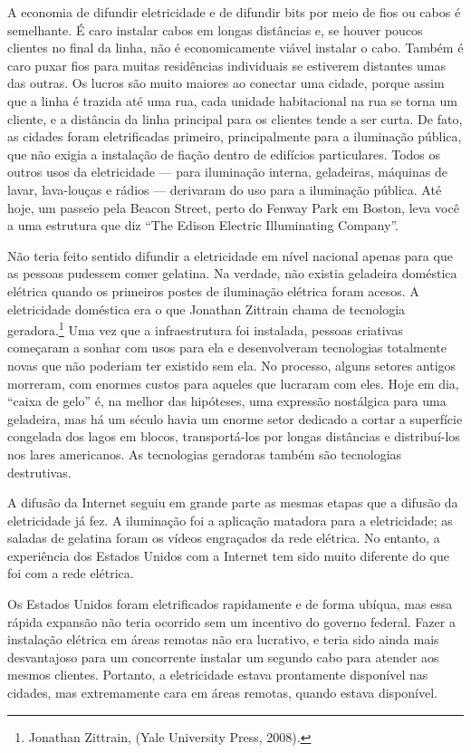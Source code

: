 A economia de difundir eletricidade e de difundir bits por meio de fios ou cabos é semelhante.
É caro instalar cabos em longas distâncias e, se houver poucos clientes no final da linha, não
é economicamente viável instalar o cabo. Também é caro puxar fios para muitas residências
individuais se estiverem distantes umas das outras. Os lucros são muito maiores ao conectar uma
cidade, porque assim que a linha é trazida até uma rua, cada unidade habitacional na rua se
torna um cliente, e a distância da linha principal para os clientes tende a ser curta. De fato,
as cidades foram eletrificadas primeiro, principalmente para a iluminação pública, que não exigia
a instalação de fiação dentro de edifícios particulares. Todos os outros usos da eletricidade
--- para iluminação interna, geladeiras, máquinas de lavar, lava-louças e rádios --- derivaram do
uso para a iluminação pública. Até hoje, um passeio pela Beacon Street, perto do Fenway Park em
Boston, leva você a uma estrutura que diz ``The Edison Electric Illuminating Company''.

Não teria feito sentido difundir a eletricidade em nível nacional apenas para que as pessoas
pudessem comer gelatina. Na verdade, não existia geladeira doméstica elétrica quando os primeiros
postes de iluminação elétrica foram acesos. A eletricidade doméstica era o que Jonathan Zittrain
chama de tecnologia geradora.\footnote{Jonathan Zittrain,  (Yale University Press, 2008).} Uma vez que a infraestrutura foi instalada,
pessoas criativas começaram a sonhar com usos para ela e desenvolveram tecnologias totalmente
novas que não poderiam ter existido sem ela. No processo, alguns setores antigos morreram, com
enormes custos para aqueles que lucraram com eles. Hoje em dia, ``caixa de gelo'' é, na melhor das
hipóteses, uma expressão nostálgica para uma geladeira, mas há um século havia um enorme setor
dedicado a cortar a superfície congelada dos lagos em blocos, transportá-los por longas distâncias
e distribuí-los nos lares americanos. As tecnologias geradoras também são tecnologias destrutivas.

A difusão da Internet seguiu em grande parte as mesmas etapas que a difusão da eletricidade já fez.
A iluminação foi a aplicação matadora para a eletricidade; as saladas de gelatina foram os vídeos
engraçados da rede elétrica. No entanto, a experiência dos Estados Unidos com a Internet tem sido
muito diferente do que foi com a rede elétrica.

Os Estados Unidos foram eletrificados rapidamente e de forma ubíqua, mas essa rápida expansão não
teria ocorrido sem um incentivo do governo federal. Fazer a instalação elétrica em áreas remotas
não era lucrativo, e teria sido ainda mais desvantajoso para um concorrente instalar um segundo
cabo para atender aos mesmos clientes. Portanto, a eletricidade estava prontamente disponível nas
cidades, mas extremamente cara em áreas remotas, quando estava disponível.

